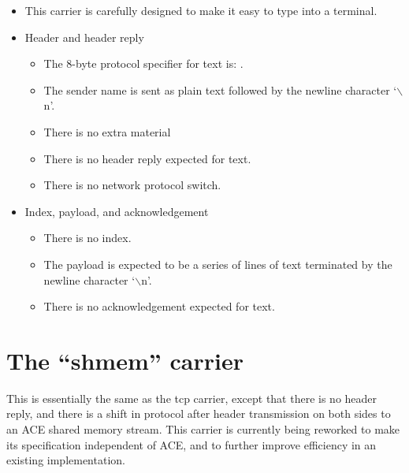 \begin{itemize}

\item This carrier is carefully designed to make it easy to type into
  a terminal.

\item{Header and header reply}

  \begin{itemize}
    
  \item The 8-byte protocol specifier for text is: .  

  \item The sender name is sent as plain text followed by the newline
  character `$\backslash$n'.

  \item There is no extra material

  \item There is no header reply expected for text.
  
  \item There is no network protocol switch.

  \end{itemize}

\item{Index, payload, and acknowledgement}

  \begin{itemize}

  \item There is no index.

  \item The payload is expected to be a series of lines of text
    terminated by the newline character `$\backslash$n'.

  \item There is no acknowledgement expected for text.

  \end{itemize}
  
\end{itemize}


\section{The ``shmem'' carrier}

This is essentially the same as the tcp carrier, except that there is no
header reply, and there is a shift in protocol after header transmission
on both sides to an ACE shared memory stream.  This carrier is 
currently being reworked to make its specification independent of ACE, 
and to further improve efficiency in an existing implementation.

